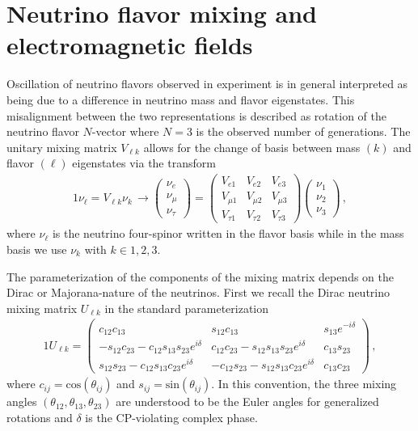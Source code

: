 \section{Neutrino flavor mixing and electromagnetic fields}
\label{sec:nuflavor}
Oscillation of neutrino flavors observed in experiment is in general interpreted as being due to a difference in neutrino mass and flavor eigenstates. This misalignment between the two representations is described as rotation of the neutrino flavor $N$-vector where $N=3$ is the observed number of generations. The unitary mixing matrix $V_{\ell k}$ allows for the change of basis between mass $(k)$ and flavor $(\ell)$ eigenstates via the transform 
\begin{alignat}{1}
    \label{basis:1} \nu_{\ell}=V_{\ell k}\nu_{k}\,\rightarrow
    \begin{pmatrix}
        \nu_{e}\\
        \nu_{\mu}\\
        \nu_{\tau}
    \end{pmatrix}=
    \begin{pmatrix}
        V_{e1} & V_{e2} & V_{e3}\\
        V_{\mu1} & V_{\mu2} & V_{\mu3}\\
        V_{\tau1} & V_{\tau2} & V_{\tau3}
    \end{pmatrix}
    \begin{pmatrix}
        \nu_{1}\\
        \nu_{2}\\
        \nu_{3}
    \end{pmatrix}\,,
\end{alignat}
where $\nu_{\ell}$ is the neutrino four-spinor written in the flavor basis while in the mass basis we use $\nu_{k}$ with $k\in1,2,3$.

The parameterization of the components of the mixing matrix depends on the Dirac or Majorana-nature of the neutrinos. First we recall the Dirac neutrino mixing matrix $U_{\ell k}$ in the standard parameterization~\citep{Schwartz:2014sze} 
\begin{alignat}{1}
    \label{rotation:1} U_{\ell k} =
    \begin{pmatrix}
         c_{12}c_{13} & s_{12}c_{13} & s_{13}e^{-i\delta}\\
         -s_{12}c_{23} - c_{12}s_{13}s_{23}e^{i\delta} & c_{12}c_{23} - s_{12}s_{13}s_{23}e^{i\delta} & c_{13}s_{23}\\
         s_{12}s_{23} - c_{12}s_{13}c_{23}e^{i\delta}& -c_{12}s_{23} - s_{12}s_{13}c_{23}e^{i\delta} & c_{13}c_{23}
    \end{pmatrix}\,,
\end{alignat}
where $c_{ij} = \mathrm{cos}(\theta_{ij})$ and $s_{ij} = \mathrm{sin}(\theta_{ij})$. In this convention, the three mixing angles $(\theta_{12}, \theta_{13}, \theta_{23})$ are understood to be the Euler angles for generalized rotations and $\delta$ is the CP-violating complex phase. 

